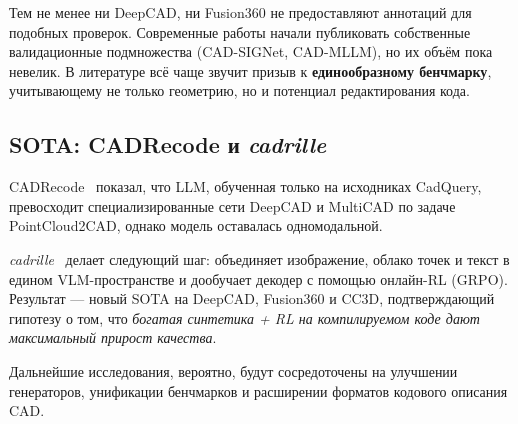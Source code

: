 Тем не менее ни DeepCAD, ни Fusion360 не предоставляют аннотаций
для подобных проверок. Современные работы начали публиковать
собственные валидационные подмножества (CAD-SIGNet, CAD-MLLM),
но их объём пока невелик. В литературе всё чаще звучит призыв к
\textbf{единообразному бенчмарку}, учитывающему не только геометрию,
но и потенциал редактирования кода.

\subsection{SOTA: CADRecode и \textit{cadrille}}

CADRecode~\cite{rukhovich24_cadrecode} показал, что LLM, обученная только на
исходниках CadQuery, превосходит специализированные сети DeepCAD и MultiCAD по
задаче PointCloud2CAD, однако модель оставалась одномодальной.

\textit{cadrille}~\cite{kolodiazhnyi25_cadrille} делает следующий шаг:
объединяет изображение, облако точек и текст в едином VLM-пространстве
и дообучает декодер с помощью онлайн-RL (GRPO). Результат — новый
SOTA на DeepCAD, Fusion360 и CC3D, подтверждающий гипотезу о том, что
\textit{богатая синтетика + RL на компилируемом коде дают максимальный
	прирост качества}.

Дальнейшие исследования, вероятно, будут сосредоточены на улучшении
генераторов, унификации бенчмарков и расширении форматов кодового
описания CAD.

\newpage